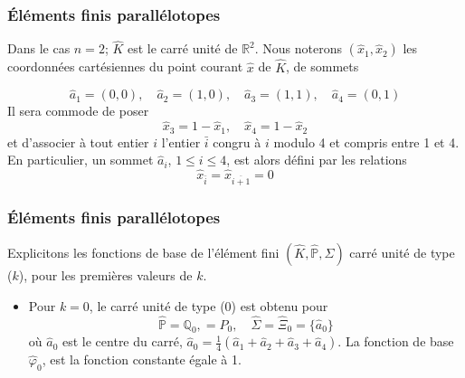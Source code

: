 \documentclass{beamer}
\begin{document}
\begin{frame}
\frametitle{Éléments finis parallélotopes}
  Dans le cas $n = 2$;  $\widehat{K}$ est le carré unité de $\mathbb{R}^2$. Nous noterons $(\hat{x}_1, \hat{x}_2)$ les coordonnées cartésiennes du point courant $\hat{x}$ de $\widehat{K}$, de sommets

\begin{equation}
\hat{a}_1=(0,0),\quad \hat{a}_2=(1,0),\quad \hat{a}_3=(1,1),\quad \hat{a}_4=(0,1)
\end{equation} 
Il sera commode de poser
\begin{equation}
\hat{x}_3=1-\hat{x}_1,\quad \hat{x}_4=1-\hat{x}_2
\end{equation}
et d'associer à tout entier $i$ l'entier $\bar{i}$ congru à $i$ modulo 4 et compris entre 1 et 4.  En particulier, un sommet $\hat{a}_i$, $1\leq i \leq  4$, est alors défini par les relations
\[\hat{x}_{\bar{i}}=\hat{x}_{\overline{i+1}}=0\]

\end{frame}

\begin{frame}
\frametitle{Éléments finis parallélotopes}
  Explicitons les fonctions de base de l'élément fini $(\widehat{K},\widehat{\mathbb{P}},\widehat{\Sigma})$ carré unité de type ($k$), pour les premières valeurs de $k$.
\begin{itemize}
\item Pour $k=0$, le carré unité de type (0) est obtenu pour
\[\widehat{\mathbb{P}} = \mathbb{Q}_0, = P_0 ,\quad \widehat{\Sigma} =\widehat{\Xi}_0=\{\hat{a}_0\}\]
où $\hat{a}_0$ est le centre du carré, $\hat{a}_0=\frac 14(\hat{a}_1+\hat{a}_2+\hat{a}_3+\hat{a}_4)$. La fonction de base $\widehat{\varphi}_0$, est la fonction constante égale à 1.
\end{itemize}
\end{frame}
\end{document}
